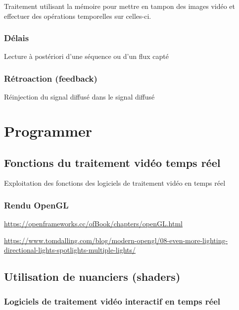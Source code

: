 \documentclass[
  french,
]{book}
\begin{document}
Traitement utilisant la mémoire pour mettre en tampon des images vidéo et effectuer des opérations temporelles sur celles-ci.

\hypertarget{duxe9lais}{%
\subsection{Délais}\label{duxe9lais}}

Lecture à postériori d'une séquence ou d'un flux capté

\hypertarget{ruxe9troaction-feedback}{%
\subsection{Rétroaction (feedback)}\label{ruxe9troaction-feedback}}

Réinjection du signal diffusé dans le signal diffusé

\hypertarget{programmer}{%
\chapter{Programmer}\label{programmer}}

\hypertarget{fonctions-du-traitement-viduxe9o-temps-ruxe9el}{%
\section{Fonctions du traitement vidéo temps réel}\label{fonctions-du-traitement-viduxe9o-temps-ruxe9el}}

Exploitation des fonctions des logiciels de traitement vidéo en temps réel

\hypertarget{rendu-opengl}{%
\subsection{Rendu OpenGL}\label{rendu-opengl}}

\url{https://openframeworks.cc/ofBook/chapters/openGL.html}

\url{https://www.tomdalling.com/blog/modern-opengl/08-even-more-lighting-directional-lights-spotlights-multiple-lights/}

\hypertarget{utilisation-de-nuanciers-shaders}{%
\section{Utilisation de nuanciers (shaders)}\label{utilisation-de-nuanciers-shaders}}

\hypertarget{traiter_logiciels}{%
\subsection{Logiciels de traitement vidéo interactif en temps réel}\label{traiter_logiciels}}
\end{document}
